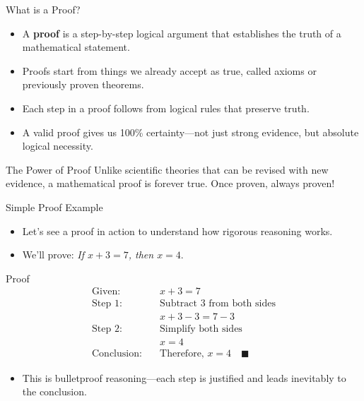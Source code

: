 \documentclass[aspectratio=169]{beamer}
\begin{document}
\begin{frame}{What is a Proof?}

\begin{itemize}
    \item A \textbf{proof} is a step-by-step logical argument that establishes the truth of a mathematical statement.
    \item Proofs start from things we already accept as true, called axioms or previously proven theorems.
    \item Each step in a proof follows from logical rules that preserve truth.
    \item A valid proof gives us 100\% certainty—not just strong evidence, but absolute logical necessity.
\end{itemize}

\begin{block}{The Power of Proof}
Unlike scientific theories that can be revised with new evidence, a mathematical proof is forever true. Once proven, always proven!
\end{block}

\end{frame}

\begin{frame}{Simple Proof Example}

\begin{itemize}
    \item Let's see a proof in action to understand how rigorous reasoning works.
    \item We'll prove: \textit{If $x + 3 = 7$, then $x = 4$}.
\end{itemize}

\begin{block}{Proof}
\begin{align*}
\text{Given:} \quad & x + 3 = 7 \\
\text{Step 1:} \quad & \text{Subtract 3 from both sides} \\
& x + 3 - 3 = 7 - 3 \\
\text{Step 2:} \quad & \text{Simplify both sides} \\
& x = 4 \\
\text{Conclusion:} \quad & \text{Therefore, } x = 4 \quad \blacksquare
\end{align*}
\end{block}

\begin{itemize}
    \item This is bulletproof reasoning—each step is justified and leads inevitably to the conclusion.
\end{itemize}

\end{frame}
\end{document}
